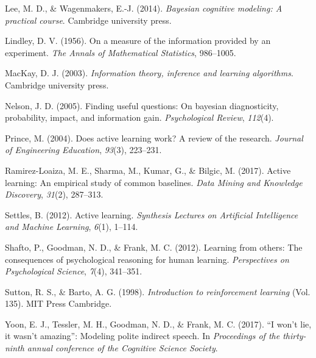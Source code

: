 \documentclass[10pt, letterpaper]{article}
\begin{document}
\hypertarget{ref-lee2014bayesian}{}
Lee, M. D., \& Wagenmakers, E.-J. (2014). \emph{Bayesian cognitive
modeling: A practical course}. Cambridge university press.

\hypertarget{ref-lindley1956}{}
Lindley, D. V. (1956). On a measure of the information provided by an
experiment. \emph{The Annals of Mathematical Statistics}, 986--1005.

\hypertarget{ref-mackay2003}{}
MacKay, D. J. (2003). \emph{Information theory, inference and learning
algorithms}. Cambridge university press.

\hypertarget{ref-nelson2005}{}
Nelson, J. D. (2005). Finding useful questions: On bayesian
diagnosticity, probability, impact, and information gain.
\emph{Psychological Review}, \emph{112}(4).

\hypertarget{ref-prince2004does}{}
Prince, M. (2004). Does active learning work? A review of the research.
\emph{Journal of Engineering Education}, \emph{93}(3), 223--231.

\hypertarget{ref-ramirez2017active}{}
Ramirez-Loaiza, M. E., Sharma, M., Kumar, G., \& Bilgic, M. (2017).
Active learning: An empirical study of common baselines. \emph{Data
Mining and Knowledge Discovery}, \emph{31}(2), 287--313.

\hypertarget{ref-settles2012active}{}
Settles, B. (2012). Active learning. \emph{Synthesis Lectures on
Artificial Intelligence and Machine Learning}, \emph{6}(1), 1--114.

\hypertarget{ref-shafto2012learning}{}
Shafto, P., Goodman, N. D., \& Frank, M. C. (2012). Learning from
others: The consequences of psychological reasoning for human learning.
\emph{Perspectives on Psychological Science}, \emph{7}(4), 341--351.

\hypertarget{ref-sutton1998}{}
Sutton, R. S., \& Barto, A. G. (1998). \emph{Introduction to
reinforcement learning} (Vol. 135). MIT Press Cambridge.

\hypertarget{ref-yoon2017}{}
Yoon, E. J., Tessler, M. H., Goodman, N. D., \& Frank, M. C. (2017). ``I
won't lie, it wasn't amazing'': Modeling polite indirect speech. In
\emph{Proceedings of the thirty-ninth annual conference of the Cognitive
Science Society}.
\end{document}
